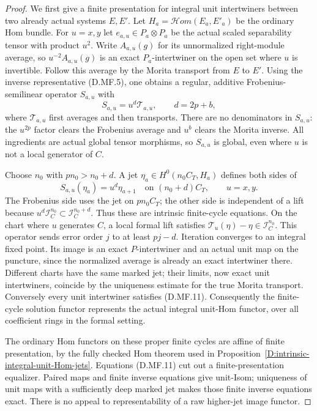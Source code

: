 \begin{proof}
We first give a finite presentation for integral unit
intertwiners between two already actual systems $E,E'$.
Let $H_a=\mathcal Hom(E_a,E'_a)$ be the ordinary Hom bundle.
For $u=x,y$ let $e_{a,u}\in P_a\otimes P_a$ be the actual
scaled separability tensor with product $u^2$.
Write $A_{a,u}(g)$ for its unnormalized right-module
average, so $u^{-2}A_{a,u}(g)$ is an exact $P_a$-intertwiner
on the open set where $u$ is invertible.
Follow this average by the Morita transport from $E$ to
$E'$. Using the inverse representative (D.MF.5), one obtains
a regular, additive Frobenius-semilinear operator $S_{a,u}$
with
\[
 S_{a,u}=u^d\mathcal T_{a,u},\qquad d=2p+b,
                                                        \tag{D.MF.10}
\]
where $\mathcal T_{a,u}$ first averages and then transports.
There are no denominators in $S_{a,u}$: the $u^{2p}$
factor clears the Frobenius average and $u^b$ clears the
Morita inverse. All ingredients are actual global tensor
morphisms, so $S_{a,u}$ is global, even where $u$ is not
a local generator of $C$.

Choose $n_0$ with $pn_0>n_0+d$. A jet
$\eta_a\in H^0(n_0C_T,H_a)$ defines both sides of
\[
 S_{a,u}(\eta_a)=u^d\eta_{a+1}
       \quad\text{on }(n_0+d)C_T,
                \qquad u=x,y.                         \tag{D.MF.11}
\]
The Frobenius side uses the jet on $pn_0C_T$;
the other side is independent of a lift because
$u^d\mathcal I_C^{n_0}\subset\mathcal I_C^{n_0+d}$.
Thus these are intrinsic finite-cycle equations.
On the chart where $u$ generates $C$, a local formal
lift satisfies $\mathcal T_u(\eta)-\eta\in\mathcal I_C^{n_0}$.
This operator sends error order $j$ to at least $pj-d$.
Iteration converges to an integral fixed point. Its image
is an exact $P$-intertwiner and an actual unit map on the
puncture, since the normalized average is already an
exact intertwiner there. Different charts have the same
marked jet; their limits, now exact unit intertwiners,
coincide by the uniqueness estimate for the true Morita
transport. Conversely every unit intertwiner satisfies
(D.MF.11). Consequently the finite-cycle solution functor
represents the actual integral unit-Hom functor, over all
coefficient rings in the formal setting.

The ordinary Hom functors on these proper finite cycles
are affine of finite presentation, by the fully checked
Hom theorem used in
Proposition~\ref{D:intrinsic-integral-unit-Hom-jets}.
Equations (D.MF.11) cut out a finite-presentation equalizer.
Paired maps and finite inverse equations give unit-Isom;
uniqueness of unit maps with a sufficiently deep marked
jet makes those finite inverse equations exact.
There is no appeal to representability of a raw higher-jet
image functor.


\end{proof}
